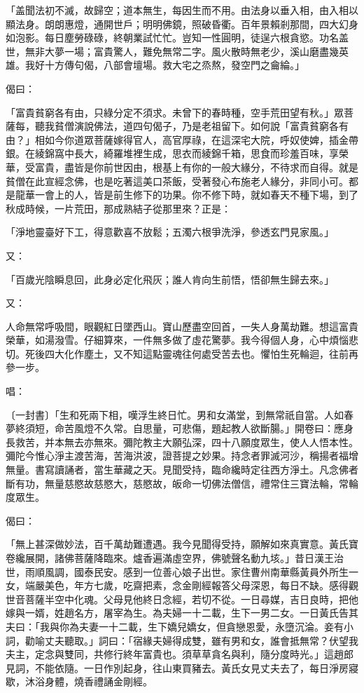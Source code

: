 \begin{showcontents}{}
「盖聞法初不滅，故歸空；道本無生，每因生而不用。由法身以垂入相，由入相以顯法身。朗朗惠燈，通開世戶；明明佛鏡，照破昏衢。百年景賴剎那間，四大幻身如泡影。每日塵勞碌碌，終朝業試忙忙。豈知一性圓明，徒逞六根貪慾。功名盖世，無非大夢一場；富貴驚人，難免無常二字。風火散時無老少，溪山磨盡幾英雄。我好十方傳句偈，八部會壇場。救大宅之烝熬，發空門之龠綸。」

偈曰：

「富貴貧窮各有由，只綠分定不須求。未曾下的春時種，空手荒田望有秋。」眾菩薩每，聽我貧僧演說佛法，道四句偈子，乃是老祖留下。如何說「富貴貧窮各有由？」相如今你道眾菩薩嫁得官人，高官厚祿，在這深宅大院，呼奴使婢，插金帶銀。在綾錦窩中長大，綺羅堆裡生成，思衣而綾錦千箱，思食而珍羞百味，享榮華，受富貴，盡皆是你前世因由，根基上有你的一般大緣分，不待求而自得。就是貧僧在此宣經念佛，也是吃著這美口茶飯，受著發心布施老人緣分，非同小可。都是龍華一會上的人，皆是前生修下的功果。你不修下時，就如春天不種下場，到了秋成時候，一片荒田，那成熟結子從那里來？正是：

「淨地靈臺好下工，得意歡喜不放鬆；五濁六根爭洗淨，參透玄門見家風。」

又：

「百歲光陰瞬息回，此身必定化飛灰；誰人肯向生前悟，悟卻無生歸去來。」

又：

人命無常呼吸間，眼觀紅日墜西山。寶山歷盡空回首，一失人身萬劫難。想這富貴榮華，如湯潑雪。仔細算來，一件無多做了虛花驚夢。我今得個人身，心中煩惱悲切。死後四大化作塵土，又不知這點靈魂往何處受苦去也。懼怕生死輪迴，往前再參一步。

唱：

〔一封書〕「生和死兩下相，嘆浮生終日忙。男和女滿堂，到無常祇自當。人如春夢終須短，命苦風燈不久常。自思量，可悲傷，題起教人欲斷腸。」開卷曰：應身長救苦，并本無去亦無來。彌陀教主大願弘深，四十八願度眾生，使人人悟本性。彌陀今惟心淨主渡苦海，苦海洪波，證菩提之妙果。持念者罪滅河沙，稱揚者福增無量。書寫讀誦者，當生華藏之天。見聞受持，臨命纔時定往西方淨土。凡念佛者斷有功，無量慈愍故慈愍大，慈愍故，皈命一切佛法僧信，禮常住三寶法輪，常輪度眾生。

偈曰：

「無上甚深做妙法，百千萬劫難遭遇。我今見聞得受持，願解如來真實意。黃氏寶卷纔展開，諸佛菩薩降臨來。爐香遍滿虛空界，佛號聲名動九垓。」昔日漢王治世，雨順風調，國泰民安。感到一位善心娘子出世。家住曹州南華縣黃員外所生一女，端嚴美色，年方七歲，吃齋把素，念金剛經報答父母深恩，每日不缺。感得觀世音菩薩半空中化魂。父母見他終日念經，若切不從。一日尋媒，吉日良時，把他嫁與一婿，姓趙名方，屠宰為生。為夫婦一十二載，生下一男二女。一日黃氏告其夫曰：「我與你為夫妻一十二載，生下嬌兒嬌女，但貪戀恩愛，永墮沉淪。妾有小詞，勸喻丈夫聽取。」詞曰：「宿緣夫婦得成雙，雖有男和女，誰會抵無常？伏望我夫主，定念與雙同，共修行終年富貴也。須草草貪名與利，隨分度時光。」這趙郎見詞，不能依隨。一日作別起身，往山東買豬去。黃氏女見丈夫去了，每日淨房寢歇，沐浴身體，燒香禮誦金剛經。


\end{showcontents}
